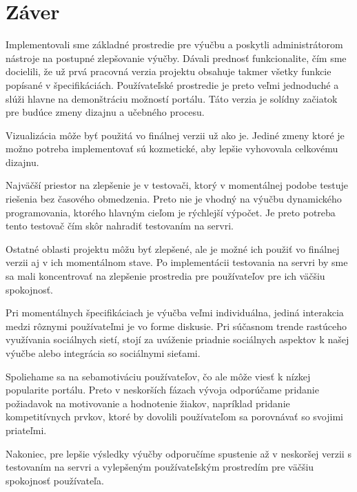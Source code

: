 \chapter*{Záver}
Implementovali sme základné prostredie pre výučbu a poskytli administrátorom
nástroje na postupné zlepšovanie výučby. Dávali prednosť funkcionalite,
čím sme docielili, že už prvá pracovná verzia projektu obsahuje takmer všetky funkcie popísané
v špecifikáciách. Používateľské prostredie je preto veľmi jednoduché a slúži hlavne na demonštráciu
možností portálu. Táto verzia je solídny začiatok pre budúce zmeny dizajnu a učebného
procesu.

Vizualizácia môže byť použitá vo finálnej verzii už ako je. Jediné zmeny ktoré
je možno potreba implementovať sú kozmetické, aby lepšie vyhovovala celkovému dizajnu.

Najväčší priestor na zlepšenie je v testovači, ktorý v momentálnej podobe testuje riešenia
bez časového obmedzenia. Preto nie je vhodný na výučbu dynamického programovania, ktorého
hlavným cieľom je rýchlejší výpočet.
Je preto potreba tento testovač čím skôr nahradiť testovaním na servri.

Ostatné oblasti projektu môžu byť zlepšené, ale je možné ich použiť vo finálnej
verzii aj v ich momentálnom stave. Po implementácii testovania na servri by sme
sa mali koncentrovať na zlepšenie prostredia pre používateľov pre ich väčšiu spokojnosť.

Pri momentálnych špecifikáciach je výučba veľmi individuálna, jediná interakcia
medzi rôznymi používateľmi je vo forme diskusie. Pri súčasnom trende rastúceho využívania
sociálnych sietí, stojí za uváženie priadnie sociálnych aspektov k našej výučbe alebo
integrácia so sociálnymi sieťami.

Spoliehame sa na sebamotiváciu používateľov, čo ale môže viesť k nízkej popularite portálu.
Preto v neskorších fázach vývoja odporúčame pridanie požiadavok na motivovanie
a hodnotenie žiakov, napríklad pridanie kompetitívnych prvkov,
ktoré by dovolili používateľom sa porovnávať so svojimi priateľmi.

Nakoniec, pre lepšie výsledky výučby odporučíme spustenie až v neskoršej verzii
s testovaním na servri a vylepšeným používateľským prostredím pre väčšiu spokojnosť používateľa.
